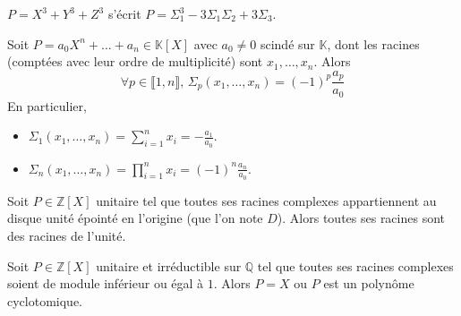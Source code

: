 	\begin{example}
		$P = X^3 + Y^3 + Z^3$ s'écrit $P = \Sigma_1^3 - 3 \Sigma_1 \Sigma_2 + 3 \Sigma_3$.
	\end{example}


	\begin{application}
		Soit $P = a_0X^n + \dots + a_n \in \mathbb{K}[X]$ avec $a_0 \neq 0$ scindé sur $\mathbb{K}$, dont les racines (comptées avec leur ordre de multiplicité) sont $x_1, \dots, x_n$. Alors
		\[ \forall p \in \llbracket 1, n \rrbracket, \, \Sigma_p(x_1, \dots, x_n) = (-1)^p \frac{a_p}{a_0} \]
		En particulier,
		\begin{itemize}
			\item $\Sigma_1(x_1, \dots, x_n) = \sum_{i=1}^n x_i = -\frac{a_1}{a_0}$.
			\item $\Sigma_n(x_1, \dots, x_n) = \prod_{i=1}^n x_i = (-1)^n \frac{a_n}{a_0}$.
		\end{itemize}
	\end{application}


	\begin{application}
		Soit $P \in \mathbb{Z}[X]$ unitaire tel que toutes ses racines complexes appartiennent au disque unité épointé en l'origine (que l'on note $D$). Alors toutes ses racines sont des racines de l'unité.
	\end{application}

	\begin{corollary}
		Soit $P \in \mathbb{Z}[X]$ unitaire et irréductible sur $\mathbb{Q}$ tel que toutes ses racines complexes soient de module inférieur ou égal à $1$. Alors $P = X$ ou $P$ est un polynôme cyclotomique.
	\end{corollary}

